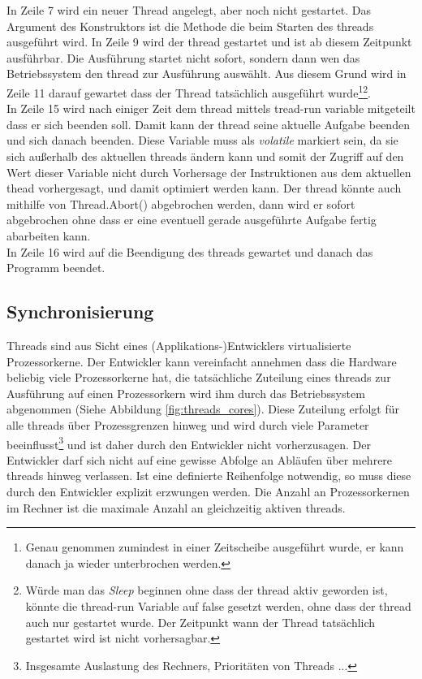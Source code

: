 In Zeile 7 wird ein neuer Thread angelegt, aber noch nicht gestartet. Das Argument des Konstruktors ist die Methode die beim Starten des threads ausgeführt wird. In Zeile 9 wird der thread gestartet und ist ab diesem Zeitpunkt ausführbar. Die Ausführung startet nicht sofort, sondern dann wen das Betriebssystem den thread zur Ausführung auswählt. Aus diesem Grund wird in Zeile 11 darauf gewartet dass der Thread tatsächlich ausgeführt wurde\footnote{Genau genommen zumindest in einer Zeitscheibe ausgeführt wurde, er kann danach ja wieder unterbrochen werden.}\footnote{Würde man das \textit{Sleep} beginnen ohne dass der thread aktiv geworden ist, könnte die thread-run Variable auf false gesetzt werden, ohne dass der thread auch nur gestartet wurde. Der Zeitpunkt wann der Thread tatsächlich gestartet wird ist nicht vorhersagbar.}.
\\In Zeile 15 wird nach einiger Zeit dem thread mittels tread-run variable mitgeteilt dass er sich beenden soll. Damit kann der thread seine aktuelle Aufgabe beenden und sich danach beenden. Diese Variable muss als \emph{volatile} markiert sein, da sie sich außerhalb des aktuellen threads ändern kann und somit der Zugriff auf den Wert dieser Variable nicht durch Vorhersage der Instruktionen aus dem aktuellen thead vorhergesagt, und damit optimiert werden kann.\cite{ms_volatile} Der thread könnte auch mithilfe von Thread.Abort() abgebrochen werden, dann wird er sofort abgebrochen ohne dass er eine eventuell gerade ausgeführte Aufgabe fertig abarbeiten kann. 
\\In Zeile 16 wird auf die Beendigung des threads gewartet und danach das Programm beendet.


\subsection{Synchronisierung}
Threads sind aus Sicht eines (Applikations-)Entwicklers virtualisierte Prozessorkerne. Der Entwickler kann vereinfacht annehmen dass die Hardware beliebig viele Prozessorkerne hat, die tatsächliche Zuteilung eines threads zur Ausführung auf einen Prozessorkern wird ihm durch das Betriebssystem abgenommen (Siehe Abbildung \ref{fig:threads_cores}). Diese Zuteilung erfolgt für alle threads über Prozessgrenzen hinweg und wird durch viele Parameter beeinflusst\footnote{Insgesamte Auslastung des Rechners, Prioritäten von Threads ...} und ist daher durch den Entwickler nicht vorherzusagen. Der Entwickler darf sich nicht auf eine gewisse Abfolge an Abläufen über mehrere threads hinweg verlassen. Ist eine definierte Reihenfolge notwendig, so muss diese durch den Entwickler explizit erzwungen werden. Die Anzahl an Prozessorkernen im Rechner ist die maximale Anzahl an gleichzeitig aktiven threads.\cite[S. 140]{Dahlin2012}

